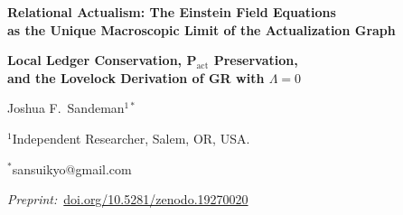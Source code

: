 \documentclass[11pt,a4paper]{article}
\begin{document}
\begin{center}
  {\LARGE\bfseries Relational Actualism: The Einstein Field Equations\\
  as the Unique Macroscopic Limit of the Actualization Graph\par}
  \vspace{6pt}
  {\large\bfseries Local Ledger Conservation, P$_{\mathrm{act}}$ Preservation,\\
  and the Lovelock Derivation of GR with $\Lambda = 0$\par}
  \vspace{14pt}
  {\large Joshua F.\ Sandeman$^{1*}$\par}
  \vspace{4pt}
  {\normalsize $^{1}$Independent Researcher, Salem, OR, USA.\par}
  {\normalsize $^{*}$sansuikyo@gmail.com\par}
  \vspace{8pt}
  {\small\textit{Preprint:}~\href{https://doi.org/10.5281/zenodo.19270020}{doi.org/10.5281/zenodo.19270020}\par}
  \vspace{14pt}
\end{center}
\end{document}
